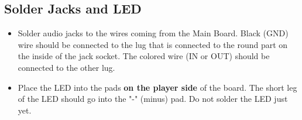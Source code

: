 \documentclass[a4paper,12pt]{article}
\begin{document}
\restoregeometry{}

\subsection{Solder Jacks and LED}

\begin{itemize}
  \item Solder audio jacks to the wires coming from the Main
    Board. Black (GND) wire should be connected to the lug
    that is connected to the round part on the inside of the
    jack socket. The colored wire (IN or OUT) should be
    connected to the other lug.
  \item Place the LED into the pads \textbf{on the player
    side} of the board. The short leg of the LED should go
    into the "-" (minus) pad. Do not solder the LED just
    yet.
\end{itemize}
\end{document}
